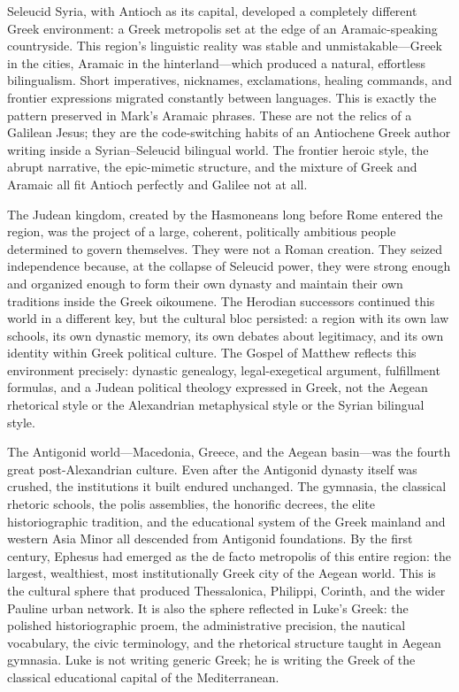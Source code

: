 Seleucid Syria, with Antioch as its capital, developed a completely different Greek environment: a Greek metropolis set at the edge of an Aramaic-speaking countryside.
This region's linguistic reality was stable and unmistakable---Greek in the cities, Aramaic in the hinterland---which produced a natural, effortless bilingualism.
Short imperatives, nicknames, exclamations, healing commands, and frontier expressions migrated constantly between languages.
This is exactly the pattern preserved in Mark's Aramaic phrases.
These are not the relics of a Galilean Jesus; they are the code-switching habits of an Antiochene Greek author writing inside a Syrian--Seleucid bilingual world.
The frontier heroic style, the abrupt narrative, the epic-mimetic structure, and the mixture of Greek and Aramaic all fit Antioch perfectly and Galilee not at all.

The Judean kingdom, created by the Hasmoneans long before Rome entered the region, was the project of a large, coherent, politically ambitious people determined to govern themselves.
They were not a Roman creation.
They seized independence because, at the collapse of Seleucid power, they were strong enough and organized enough to form their own dynasty and maintain their own traditions inside the Greek oikoumene.
The Herodian successors continued this world in a different key, but the cultural bloc persisted: a region with its own law schools, its own dynastic memory, its own debates about legitimacy, and its own identity within Greek political culture.
The Gospel of Matthew reflects this environment precisely: dynastic genealogy, legal-exegetical argument, fulfillment formulas, and a Judean political theology expressed in Greek, not the Aegean rhetorical style or the Alexandrian metaphysical style or the Syrian bilingual style.

The Antigonid world---Macedonia, Greece, and the Aegean basin---was the fourth great post-Alexandrian culture.
Even after the Antigonid dynasty itself was crushed, the institutions it built endured unchanged.
The gymnasia, the classical rhetoric schools, the polis assemblies, the honorific decrees, the elite historiographic tradition, and the educational system of the Greek mainland and western Asia Minor all descended from Antigonid foundations.
By the first century, Ephesus had emerged as the de facto metropolis of this entire region: the largest, wealthiest, most institutionally Greek city of the Aegean world.
This is the cultural sphere that produced Thessalonica, Philippi, Corinth, and the wider Pauline urban network.
It is also the sphere reflected in Luke's Greek: the polished historiographic proem, the administrative precision, the nautical vocabulary, the civic terminology, and the rhetorical structure taught in Aegean gymnasia.
Luke is not writing generic Greek; he is writing the Greek of the classical educational capital of the Mediterranean.

